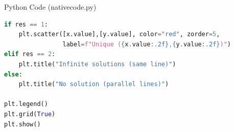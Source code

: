 \documentclass{beamer}
\begin{document}
\begin{frame}[fragile]{Python Code (nativecode.py)}
\begin{lstlisting}[language=Python]
if res == 1:
    plt.scatter([x.value],[y.value], color="red", zorder=5,
                label=f"Unique ({x.value:.2f},{y.value:.2f})")
elif res == 2:
    plt.title("Infinite solutions (same line)")
else:
    plt.title("No solution (parallel lines)")

plt.legend()
plt.grid(True)
plt.show()
\end{lstlisting}
\end{frame}
\end{document}
